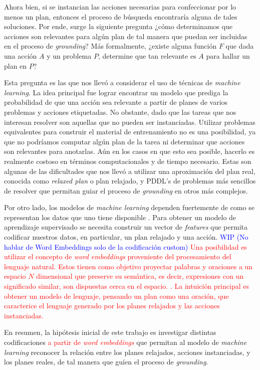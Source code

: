 Ahora bien, si se instancian las acciones necesarias para confeccionar por lo
menos un plan, entonces el proceso de búsqueda encontraría alguna de tales
soluciones. Por ende, surge la siguiente pregunta ¿cómo determinamos que
acciones son relevantes para algún plan de tal manera que puedan ser incluidas
en el proceso de \emph{grounding}? Más formalmente, ¿existe alguna función $F$
que dada una acción $A$ y un problema $P$, determine que tan relevante es $A$
para hallar un plan en $P$?

Esta pregunta es las que nos llevó a considerar el uso de técnicas de
\emph{machine learning}. La idea principal fue lograr encontrar un modelo que
prediga la probabilidad de que una acción sea relevante a partir de planes de
varios problemas y acciones etiquetadas. No obstante, dado que las tareas que
nos interesan resolver son aquellas que no pueden ser instanciadas. Utilizar
problemas equivalentes para construir el material de entrenamiento no es una
posibilidad, ya que no podríamos computar algún plan de la tarea ni determinar
que acciones son relevantes para anotarlas. Aún en los casos en que esto sea
posible, hacerlo es realmente costoso en términos computacionales y de tiempo
necesario. Estas son algunas de las dificultades que nos llevó a utilizar una
aproximación del plan real, conocida como \emph{relaxed plan} o plan relajado, y
PDDL's de problemas más sencillos de resolver que permitan guiar el proceso de
\emph{grounding} en otros más complejos.

Por otro lado, los modelos de \emph{machine learning} dependen fuertemente de
como se representan los datos que uno tiene disponible \citep{Heaton-2016-AnEA}.
Para obtener un modelo de aprendizaje supervisado se necesita construir un
vector de \emph{features} que permita codificar nuestros datos, en particular,
un plan relajado y una acción. \textcolor{blue}{WIP (No hablar de Word
Embeddings solo de la codificación custom)} \textcolor{red}{Una posibilidad es
utilizar el concepto de \emph{word embeddings} proveniente del procesamiento del
lenguaje natural. Estos tienen como objetivo proyectar palabras y oraciones a un
espacio $N$ dimensional que preserve su semántica, es decir, expresiones con un
significado similar, son dispuestas cerca en el espacio.
\citep{Mikolov-Ilya-Kai-Greg-Jeffrey-2013,
Pennington-Jeffrey-Socher-Richard-Manning-Christopher-2014,
Bojanowski-Grave-Joulin-Mikolov-2016}. La intuición principal es obtener un
modelo de lenguaje, pensando un plan como una oración, que caracterice el
lenguaje generado por los planes relajados y las acciones instanciadas.}

En resumen, la hipótesis inicial de este trabajo es investigar distintas
codificaciones \textcolor{red}{a partir de \emph{word embeddings}} que permitan
al modelo de \emph{machine learning} reconocer la relación entre los planes
relajados, acciones instanciadas, y los planes reales, de tal manera que guíen
el proceso de \emph{grounding}.